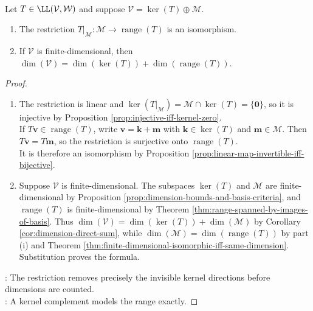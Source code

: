 \begin{proposition} \label{prop:rank-nullity-complement-view} \\
Let $T\in\LL(\mathcal{V},\mathcal{W})$ and suppose $\mathcal{V}=\ker(T)\oplus\mathcal{M}$.
\begin{enumerate}[label=(\roman*)]
\setlength{\itemsep}{0pt}
\item The restriction $T|_{\mathcal{M}}:\mathcal{M}\to\operatorname{range}(T)$ is an isomorphism.
\item If $\mathcal{V}$ is finite-dimensional, then $\dim(\mathcal{V})=\dim(\ker(T))+\dim(\operatorname{range}(T))$.
\end{enumerate}
\begin{proof}
\begin{enumerate}[label=(\roman*)]
\setlength{\itemsep}{0pt}
\item The restriction is linear and $\ker(T|_{\mathcal{M}})=\mathcal{M}\cap\ker(T)=\{\mathbf{0}\}$, so it is injective by Proposition \ref{prop:injective-iff-kernel-zero}.\\
If $T\mathbf{v}\in\operatorname{range}(T)$, write $\mathbf{v}=\mathbf{k}+\mathbf{m}$ with $\mathbf{k}\in\ker(T)$ and $\mathbf{m}\in\mathcal{M}$. Then $T\mathbf{v}=T\mathbf{m}$, so the restriction is surjective onto $\operatorname{range}(T)$.\\
It is therefore an isomorphism by Proposition \ref{prop:linear-map-invertible-iff-bijective}.
\item Suppose $\mathcal{V}$ is finite-dimensional. The subspaces $\ker(T)$ and $\mathcal{M}$ are finite-dimensional by Proposition \ref{prop:dimension-bounds-and-basis-criteria}, and $\operatorname{range}(T)$ is finite-dimensional by Theorem \ref{thm:range-spanned-by-images-of-basis}. Thus $\dim(\mathcal{V})=\dim(\ker(T))+\dim(\mathcal{M})$ by Corollary \ref{cor:dimension-direct-sum}, while $\dim(\mathcal{M})=\dim(\operatorname{range}(T))$ by part (i) and Theorem \ref{thm:finite-dimensional-isomorphic-iff-same-dimension}. Substitution proves the formula.
\end{enumerate}
: The restriction removes precisely the invisible kernel directions before dimensions are counted.\\
: A kernel complement models the range exactly.
\end{proof}
\end{proposition}

